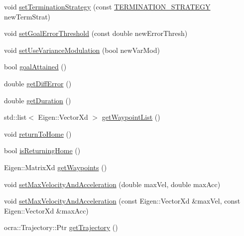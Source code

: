 \begin{DoxyCompactItemize}
\item 
void \hyperlink{classocra__recipes_1_1TrajectoryThread_ab401be5b4261576175d690b6e4a61177}{set\+Termination\+Strategy} (const \hyperlink{namespaceocra__recipes_afcf7ca623a6c39b246aa4bda629c7309}{T\+E\+R\+M\+I\+N\+A\+T\+I\+O\+N\+\_\+\+S\+T\+R\+A\+T\+E\+GY} new\+Term\+Strat)
\item 
void \hyperlink{classocra__recipes_1_1TrajectoryThread_a78eb7665f07bbdbd79bbc4553fb9d0e3}{set\+Goal\+Error\+Threshold} (const double new\+Error\+Thresh)
\item 
void \hyperlink{classocra__recipes_1_1TrajectoryThread_a230269a0ce3617e924a72b021adb6892}{set\+Use\+Variance\+Modulation} (bool new\+Var\+Mod)
\item 
bool \hyperlink{classocra__recipes_1_1TrajectoryThread_acd000c1ffee3b03d2756b04dba583285}{goal\+Attained} ()
\item 
double \hyperlink{classocra__recipes_1_1TrajectoryThread_ad523b1129c1f7c6673af3c1382838f5d}{get\+Diff\+Error} ()
\item 
double \hyperlink{classocra__recipes_1_1TrajectoryThread_a117197a2bdfb306b2b325875954bada6}{get\+Duration} ()
\item 
std\+::list$<$ Eigen\+::\+Vector\+Xd $>$ \hyperlink{classocra__recipes_1_1TrajectoryThread_a86d4b1bc73bfddf9c42f31add6ed9d6e}{get\+Waypoint\+List} ()
\item 
void \hyperlink{classocra__recipes_1_1TrajectoryThread_ac1335eaa6c85597cab894673ef9a56f9}{return\+To\+Home} ()
\item 
bool \hyperlink{classocra__recipes_1_1TrajectoryThread_a2ec19731671b7e2b39c46b337917bd31}{is\+Returning\+Home} ()
\item 
Eigen\+::\+Matrix\+Xd \hyperlink{classocra__recipes_1_1TrajectoryThread_ae6830df6ce18f3a6f5656fe345b05731}{get\+Waypoints} ()
\item 
void \hyperlink{classocra__recipes_1_1TrajectoryThread_a30b358a3d8fd4e22b61f4bedbe452403}{set\+Max\+Velocity\+And\+Acceleration} (double max\+Vel, double max\+Acc)
\item 
void \hyperlink{classocra__recipes_1_1TrajectoryThread_ade473490b8ab474a3066546f9c1de164}{set\+Max\+Velocity\+And\+Acceleration} (const Eigen\+::\+Vector\+Xd \&max\+Vel, const Eigen\+::\+Vector\+Xd \&max\+Acc)
\item 
ocra\+::\+Trajectory\+::\+Ptr \hyperlink{classocra__recipes_1_1TrajectoryThread_a546e547f5d53f80d1cfc792b11297d40}{get\+Trajectory} ()
\end{DoxyCompactItemize}
